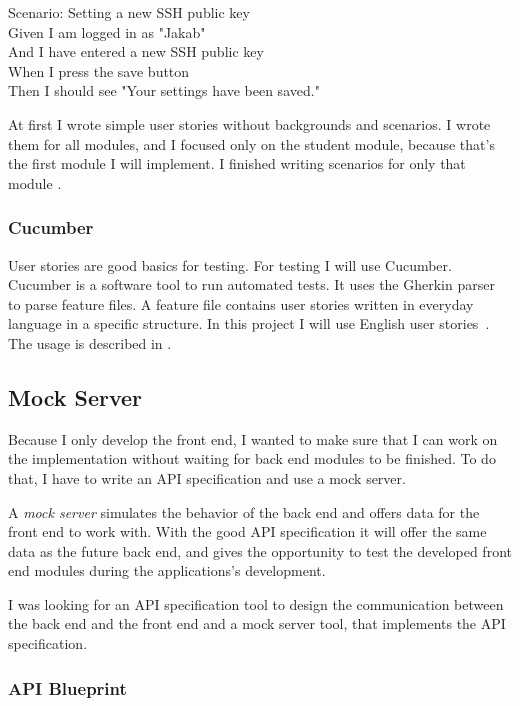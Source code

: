 Scenario: Setting a new SSH public key\\ \hspace*{1cm}
Given I am logged in as "Jakab"\\ \hspace*{1cm}
And I have entered a new SSH public key\\ \hspace*{1cm}
When I press the save button\\ \hspace*{1cm}
Then I should see "Your settings have been saved."

At first I wrote simple user stories without backgrounds and scenarios. I wrote them for all modules, and I focused only on the student module, because that's the first module I will implement. I finished writing scenarios for only that module .

\subsubsection{Cucumber}
User stories are good basics for testing. For testing I will use Cucumber. Cucumber is a software tool to run automated tests. It uses the Gherkin parser to parse feature files. A feature file contains user stories written in everyday language in a specific structure. In this project I will use English user stories~\cite{Cucumber-gherkin}. The usage is described in .


\subsection{Mock Server}

Because I only develop the front end, I wanted to make sure that I can work on the implementation without waiting for back end modules to be finished. To do that, I have to write an API specification and use a mock server. 

A \emph{mock server} simulates the behavior of the back end and offers data for the front end to work with. With the good API specification it will offer the same data as the future back end, and gives the opportunity to test the developed front end modules during the applications's development.

I was looking for an API specification tool to design the communication between the back end and the front end and a mock server tool, that implements the API specification.

\subsubsection{API Blueprint}
\label{api-blueprint}

